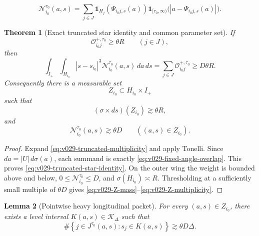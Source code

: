 \documentclass[10pt]{article}
\newtheorem{theorem}{Theorem}[section]
\newtheorem{lemma}[theorem]{Lemma}
\begin{document}
\begin{equation}
\label{eq:v029-truncated-multiplicity}
\boxed{
\mathcal N_{i_0}^{\tau_0}(a,s)
=
\sum_{j\in J}
\mathbf 1_{H_j}(\Psi_{i_0j,s}(a))
\mathbf 1_{[\tau_0,\infty)}
\bigl(|a-\Psi_{i_0j,s}(a)|\bigr).
}
\end{equation}

\begin{theorem}[Exact truncated star identity and common parameter set]
\label{thm:v029-truncated-star}
If
\[
\mathscr O_{i_0j}^{+,\tau_0}
\ge
\theta R
\qquad
(j\in J),
\]
then
\begin{equation}
\label{eq:v029-truncated-star-identity}
\boxed{
\int_{I_+}\int_{H_{i_0}}
|s-s_{i_0}|^3
\mathcal N_{i_0}^{\tau_0}(a,s)
\,da\,ds
=
\sum_{j\in J}
\mathscr O_{i_0j}^{+,\tau_0}
\ge
D\theta R.
}
\end{equation}
Consequently there is a measurable set
\[
Z_{i_0}
\subset
H_{i_0}\times I_+
\]
such that
\begin{equation}
\label{eq:v029-Z-mass}
\boxed{
(\sigma\times ds)(Z_{i_0})
\gtrsim
\theta R,
}
\end{equation}
and
\begin{equation}
\label{eq:v029-Z-multiplicity}
\boxed{
\mathcal N_{i_0}^{\tau_0}(a,s)
\gtrsim
\theta D
\qquad
((a,s)\in Z_{i_0}).
}
\end{equation}
\end{theorem}

\begin{proof}
Expand
\eqref{eq:v029-truncated-multiplicity} and apply Tonelli.  Since
\(da=|U|\,d\sigma(a)\), each summand is exactly
\eqref{eq:v029-fixed-angle-overlap}.  This proves
\eqref{eq:v029-truncated-star-identity}.  On the outer wing the weight is bounded above and below,
\(0\le\mathcal N_{i_0}^{\tau_0}\le D\), and \(\sigma(H_{i_0})\asymp R\).  Thresholding at a
sufficiently small multiple of \(\theta D\) gives
\eqref{eq:v029-Z-mass}--\eqref{eq:v029-Z-multiplicity}.
\end{proof}

\begin{lemma}[Pointwise heavy longitudinal packet]
\label{lem:v029-heavy-packet}
For every \((a,s)\in Z_{i_0}\), there exists a level interval \(K(a,s)\in\mathcal K_\Delta\) such
that
\begin{equation}
\label{eq:v029-heavy-packet}
\boxed{
\#\left\{
j\in J^{\tau_0}(a,s):
s_j\in K(a,s)
\right\}
\gtrsim
\theta D\Delta.
}
\end{equation}
\end{lemma}
\end{document}
